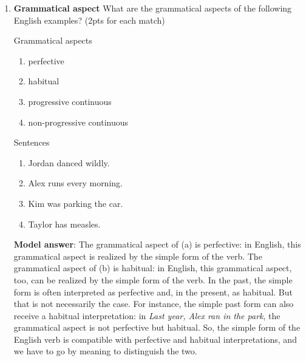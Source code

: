 \documentclass[a4,11pt]{article}
\newcommand{\6}{\mbox{$[\hspace*{-.6mm}[$}}
\newcommand{\9}{\mbox{$]\hspace*{-.6mm}]$}}
\begin{document}
\begin{enumerate}[leftmargin = 12pt]
Sentences:

\begin{enumerate}[noitemsep]
\item Taylor loves apple pie.
\item Jordan danced wildly.
\item Kim is parking the car.
\item Alex will wink at Sam.
\item Cameron is taking the train later today.
\end{enumerate}

{\bf Model answer}: The tense of the sentences in (a), (c) and (e) is present, the tense of the sentence in (b) is past and the tense of the sentence in (d) is future. If you said that the tense of (e) is future, be careful not to confuse tense and aspect: the finite verb of the example in (e) is {\em is}, which is present tense (future would be {\em will be}). The fact that the situation in (e) is in the future is not due to tense but due to the progressive aspect, which is compatible with future situations. In general, tense is {\bf always} marked on the finite verb.

\item {\bf Grammatical aspect} What are the grammatical aspects of the following English examples? (2pts for each match)

Grammatical aspects

\begin{enumerate}[noitemsep]
\item perfective
\item habitual
\item progressive continuous
\item non-progressive continuous
\end{enumerate}

Sentences

\begin{enumerate}[noitemsep]
\item Jordan danced wildly.
\item Alex runs every morning.
\item Kim was parking the car.
\item Taylor has measles.
\end{enumerate}

{\bf Model answer}: The grammatical aspect of (a) is perfective: in English, this grammatical aspect is realized by the simple form of the verb. The grammatical aspect of (b) is habitual: in English, this grammatical aspect, too, can be realized by the simple form of the verb. In the past, the simple form is often interpreted as perfective and, in the present, as habitual. But that is not necessarily the case. For instance, the simple past form can also receive a habitual interpretation: in {\em Last year, Alex ran in the park}, the grammatical aspect is not perfective but habitual. So, the simple form of the English verb is compatible with perfective and habitual interpretations, and we have to go by meaning to distinguish the two.


\end{enumerate}
\end{document}
